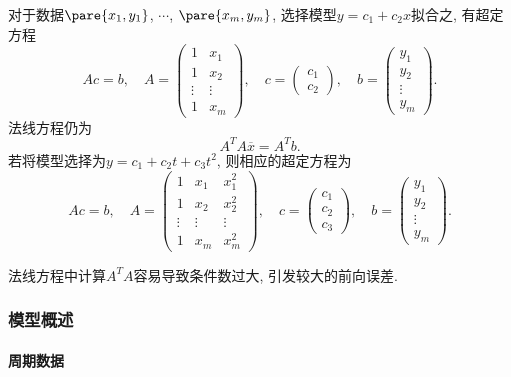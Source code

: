\documentclass{ctexart}
\begin{document}
对于数据$\pare{x_1,y_1}$, $\cdots$, $\pare{x_m,y_m}$, 选择模型$y = c_1 + c_2 x$拟合之, 有超定方程
\[ Ac=b,\quad A = \begin{pmatrix}
    1 & x_1 \\ 1 & x_2 \\ \vdots & \vdots \\ 1 & x_m
\end{pmatrix},\quad c = \begin{pmatrix}
    c_1 \\ c_2
\end{pmatrix},\quad b = \begin{pmatrix}
    y_1 \\ y_2 \\ \vdots \\ y_m
\end{pmatrix}. \]
法线方程仍为
\[ A^T A\overbar{x} = A^T b. \]
若将模型选择为$y = c_1 + c_2t + c_3t^2$, 则相应的超定方程为
\[ Ac=b,\quad A = \begin{pmatrix}
    1 & x_1 & x_1^2 \\
    1 & x_2 & x_2^2 \\
    \vdots & \vdots & \vdots \\
    1 & x_m & x_m^2
\end{pmatrix},\quad c = \begin{pmatrix}
    c_1 \\ c_2 \\ c_3
\end{pmatrix},\quad b = \begin{pmatrix}
    y_1 \\ y_2 \\ \vdots \\ y_m
\end{pmatrix}. \]

\begin{remark}
    法线方程中计算$A^TA$容易导致条件数过大, 引发较大的前向误差.
\end{remark}



\subsubsection{模型概述} %
\label{ssub:模型概述}

\paragraph{周期数据} %
\label{par:周期数据}
\end{document}
